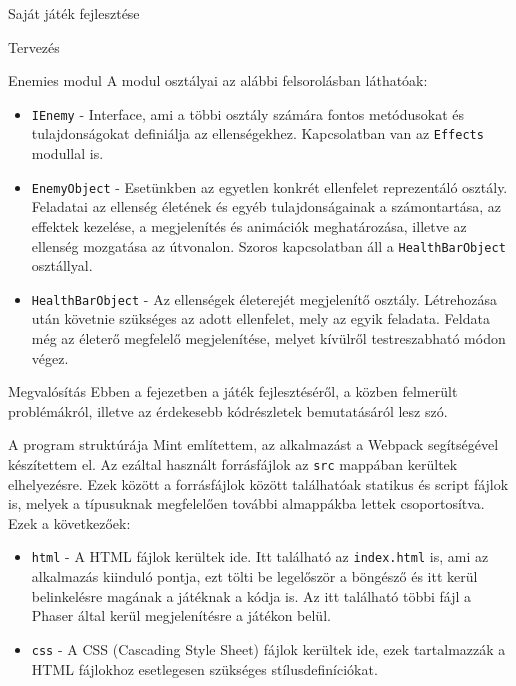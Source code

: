 \begin{MyChapter}{Saját játék fejlesztése}
\begin{MySection}{Tervezés}
\begin{MySubSection}{Enemies modul}
			A modul osztályai az alábbi felsorolásban láthatóak:
			\begin{itemize}			
				\item \texttt{IEnemy} - Interface, ami a többi osztály számára fontos metódusokat és tulajdonságokat definiálja az ellenségekhez. Kapcsolatban van az \texttt{Effects} modullal is.
				
				\item \texttt{EnemyObject} - Esetünkben az egyetlen konkrét ellenfelet reprezentáló osztály. Feladatai az ellenség életének és egyéb tulajdonságainak a számontartása, az effektek kezelése, a megjelenítés és animációk meghatározása, illetve az ellenség mozgatása az útvonalon. Szoros kapcsolatban áll a \texttt{HealthBarObject} osztállyal.
				
				\item \texttt{HealthBarObject} - Az ellenségek életerejét megjelenítő osztály. Létrehozása után követnie szükséges az adott ellenfelet, mely az egyik feladata. Feldata még az életerő megfelelő megjelenítése, melyet kívülről testreszabható módon végez.
				
			\end{itemize}
		\end{MySubSection}
	
	\end{MySection}
	
	\begin{MySection}{Megvalósítás}	
		Ebben a fejezetben a játék fejlesztéséről, a közben felmerült problémákról, illetve az érdekesebb kódrészletek bemutatásáról lesz szó.
		
		\begin{MySubSection}{A program struktúrája}
			Mint említettem, az alkalmazást a Webpack segítségével készítettem el. Az ezáltal használt forrásfájlok az \texttt{src} mappában kerültek elhelyezésre. Ezek között a forrásfájlok között találhatóak statikus és script fájlok is, melyek a típusuknak megfelelően további almappákba lettek csoportosítva.
			Ezek a következőek:
			
			\begin{itemize}
				\item \texttt{html} - A HTML fájlok kerültek ide. Itt található az \texttt{index.html} is, ami az alkalmazás kiinduló pontja, ezt tölti be legelőször a böngésző és itt kerül belinkelésre magának a játéknak a kódja is. Az itt található többi fájl a Phaser által kerül megjelenítésre a játékon belül.
				
				\item \texttt{css} - A CSS (Cascading Style Sheet) fájlok kerültek ide, ezek tartalmazzák a HTML fájlokhoz esetlegesen szükséges stílusdefiníciókat.
				

\end{itemize}
\end{MySubSection}
\end{MySection}
\end{MyChapter}
